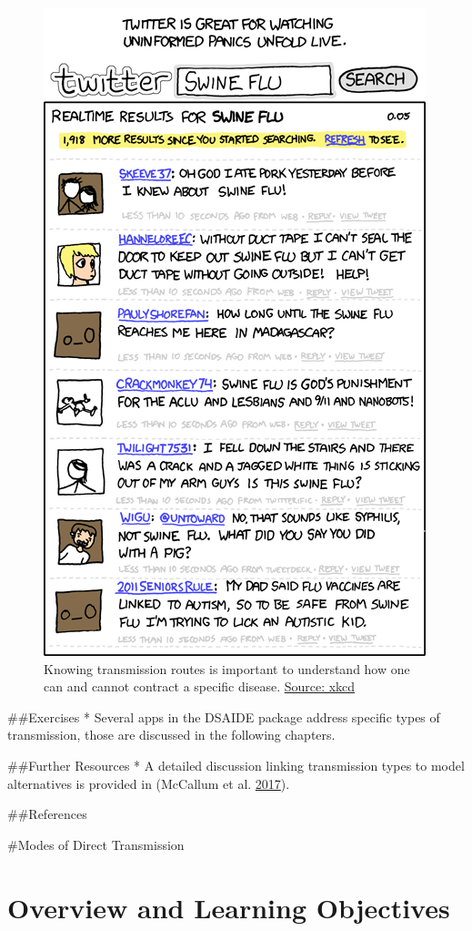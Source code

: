 \documentclass[]{book}
\theoremstyle{definition}
\theoremstyle{definition}
\theoremstyle{definition}
\theoremstyle{remark}
\begin{document}
\begin{figure}
\centering
\includegraphics{./images/xkcd-swine_flu.png}
\caption{Knowing transmission routes is important to understand how one
can and cannot contract a specific disease.
\href{https://xkcd.com/574/}{Source: xkcd}}
\end{figure}

\#\#Exercises * Several apps in the DSAIDE package address specific
types of transmission, those are discussed in the following chapters.

\#\#Further Resources * A detailed discussion linking transmission types
to model alternatives is provided in (McCallum et al.
\protect\hyperlink{ref-mccallum17}{2017}).

\#\#References

\#Modes of Direct Transmission

\hypertarget{overview-and-learning-objectives-5}{%
\section{Overview and Learning
Objectives}\label{overview-and-learning-objectives-5}}
\end{document}
